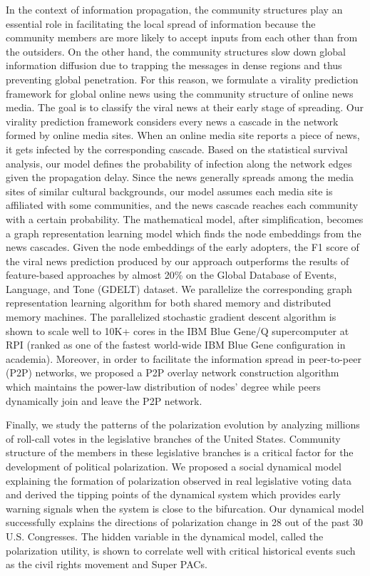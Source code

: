 In the context of information propagation, the community structures play an essential role in facilitating the local spread of information because the community members are more likely to accept inputs from each other than from the outsiders. On the other hand, the community structures slow down global information diffusion due to trapping the messages in dense regions and thus preventing global penetration. For this reason, we formulate a virality prediction framework for global online news using the community structure of online news media. The goal is to classify the viral news at their early stage of spreading. Our virality prediction framework considers every news a cascade in the network formed by online media sites. When an online media site reports a piece of news, it gets infected by the corresponding cascade. Based on the statistical survival analysis, our model defines the probability of infection along the network edges given the propagation delay. Since the news generally spreads among the media sites of similar cultural backgrounds, our model assumes each media site is affiliated with some communities, and the news cascade reaches each community with a certain probability. The mathematical model, after simplification, becomes a graph representation learning model which finds the node embeddings from the news cascades. Given the node embeddings of the early adopters, the F1 score of the viral news prediction produced by our approach outperforms the results of feature-based approaches by almost 20\% on the Global Database of Events, Language, and Tone (GDELT) dataset. We parallelize the corresponding graph representation learning algorithm for both shared memory and distributed memory machines. The parallelized stochastic gradient descent algorithm is shown to scale well to 10K+ cores in the IBM Blue Gene/Q supercomputer at RPI (ranked as one of the fastest world-wide IBM Blue Gene configuration in academia). Moreover, in order to facilitate the information spread in peer-to-peer (P2P) networks, we proposed a P2P overlay network construction algorithm which maintains the power-law distribution of nodes’ degree while peers dynamically join and leave the P2P network.

Finally, we study the patterns of the polarization evolution by analyzing millions of roll-call votes in the legislative branches of the United States. Community structure of the members in these legislative branches is a critical factor for the development of political polarization. We proposed a social dynamical model explaining the formation of polarization observed in real legislative voting data and derived the tipping points of the dynamical system which provides early warning signals when the system is close to the bifurcation. Our dynamical model successfully explains the directions of polarization change in 28 out of the past 30 U.S. Congresses. The hidden variable in the dynamical model, called the polarization utility, is shown to correlate well with critical historical events such as the civil rights movement and Super PACs.